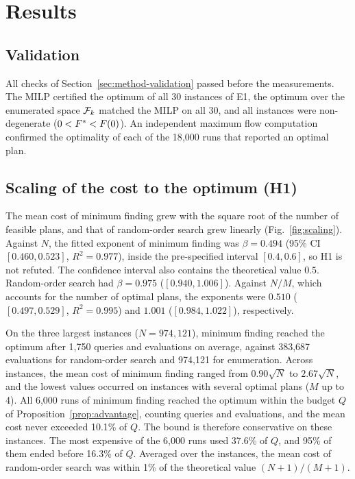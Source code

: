 \section{Results}\label{sec:results}

\subsection{Validation}\label{sec:results-validation}
All checks of Section~\ref{sec:method-validation} passed before the measurements. The MILP certified the optimum of all 30 instances of E1, the optimum over the enumerated space $\mathcal{F}_k$ matched the MILP on all 30, and all instances were non-degenerate ($0<F^{*}<F(0)$). An independent maximum flow computation confirmed the optimality of each of the 18{,}000 runs that reported an optimal plan.

\subsection{Scaling of the cost to the optimum (H1)}\label{sec:results-scaling}
The mean cost of minimum finding grew with the square root of the number of feasible plans, and that of random-order search grew linearly (Fig.~\ref{fig:scaling}). Against $N$, the fitted exponent of minimum finding was $\beta=0.494$ (95\% CI $[0.460,0.523]$, $R^2=0.977$), inside the pre-specified interval $[0.4,0.6]$, so H1 is not refuted. The confidence interval also contains the theoretical value $0.5$. Random-order search had $\beta=0.975$ ($[0.940,1.006]$). Against $N/M$, which accounts for the number of optimal plans, the exponents were $0.510$ ($[0.497,0.529]$, $R^2=0.995$) and $1.001$ ($[0.984,1.022]$), respectively.

On the three largest instances ($N=974{,}121$), minimum finding reached the optimum after 1{,}750 queries and evaluations on average, against 383{,}687 evaluations for random-order search and 974{,}121 for enumeration. Across instances, the mean cost of minimum finding ranged from $0.90\sqrt{N}$ to $2.67\sqrt{N}$, and the lowest values occurred on instances with several optimal plans ($M$ up to 4). All 6{,}000 runs of minimum finding reached the optimum within the budget $Q$ of Proposition~\ref{prop:advantage}, counting queries and evaluations, and the mean cost never exceeded 10.1\% of $Q$. The bound is therefore conservative on these instances. The most expensive of the 6{,}000 runs used 37.6\% of $Q$, and 95\% of them ended before 16.3\% of $Q$. Averaged over the instances, the mean cost of random-order search was within 1\% of the theoretical value $(N+1)/(M+1)$.


